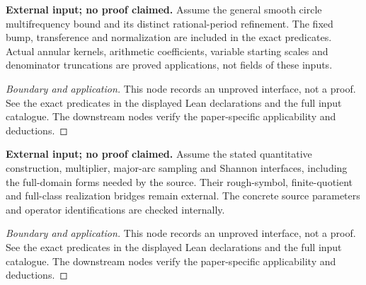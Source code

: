 \begin{lemma}
\label{input_multifrequency}
\textbf{External input; no proof claimed.} Assume the general smooth circle multifrequency bound and its distinct rational-period refinement. The fixed bump, transference and normalization are included in the exact predicates. Actual annular kernels, arithmetic coefficients, variable starting scales and denominator truncations are proved applications, not fields of these inputs.
\end{lemma}
\begin{proof}[Boundary and application]
This node records an unproved interface, not a proof. See the exact predicates in the displayed Lean declarations and the full input catalogue. The downstream nodes verify the paper-specific applicability and deductions.
\end{proof}

\begin{lemma}
\label{input_iw_sampling}
\textbf{External input; no proof claimed.} Assume the stated quantitative construction, multiplier, major-arc sampling and Shannon interfaces, including the full-domain forms needed by the source. Their rough-symbol, finite-quotient and full-class realization bridges remain external. The concrete source parameters and operator identifications are checked internally.
\end{lemma}
\begin{proof}[Boundary and application]
This node records an unproved interface, not a proof. See the exact predicates in the displayed Lean declarations and the full input catalogue. The downstream nodes verify the paper-specific applicability and deductions.
\end{proof}


